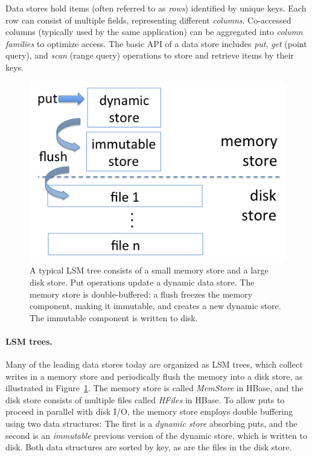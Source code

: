 
Data stores hold items (often referred to as \emph{rows})
identified by unique keys. Each row can consist of multiple fields, representing different \emph{columns}.
Co-accessed columns (typically used by the same application) can be aggregated
into  \emph{column families} to optimize access.
The basic API of a data store includes \emph{put}, \emph{get} (point query), and \emph{scan} (range query) 
operations to store and retrieve items by their keys.

\begin{figure}[tbh]
\center
\includegraphics[width=0.85\columnwidth]{LSM} 
\caption{A typical LSM tree consists of a small memory store and a large disk store. 
Put operations update a dynamic data store. The memory store is double-buffered: 
a flush freezes the memory component, making it immutable, and creates a new dynamic store.
The immutable component is written to disk.}
\label{fig:LSM}
\end{figure}

\paragraph{LSM trees.}
Many of the leading data stores today are organized as LSM trees, which collect writes in a memory store 
and periodically flush the memory into a disk store, as illustrated in Figure~\ref{fig:LSM}. 
The memory store is called \emph{MemStore} in HBase, and the disk store consists of multiple files
called \emph{HFiles} in HBase.
To allow puts to proceed in parallel with disk I/O, the memory store employs double buffering using two data structures: 
The first is a  \emph{dynamic store} absorbing puts, and the second is 
an \emph{immutable} previous version of the dynamic store, which is written to disk. 
Both data structures are sorted by key, as are the files in the disk store. 

